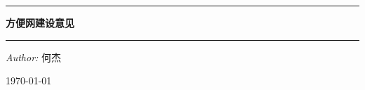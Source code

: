 \begin{titlepage}
	\begin{center}
		
		
		
		
		\rule[1pt]{\textwidth}{2pt}		
		{ \huge \bfseries 方便网建设意见 \\[0.5cm] }		
		\rule[10pt]{\textwidth}{2pt}
		
		\begin{minipage}{1.0\textwidth}
			\begin{center} \large
				\emph{Author:} 何杰
			\end{center}
		\end{minipage}


		\vfill

		{\large \today}
		
	\end{center}

\end{titlepage}
